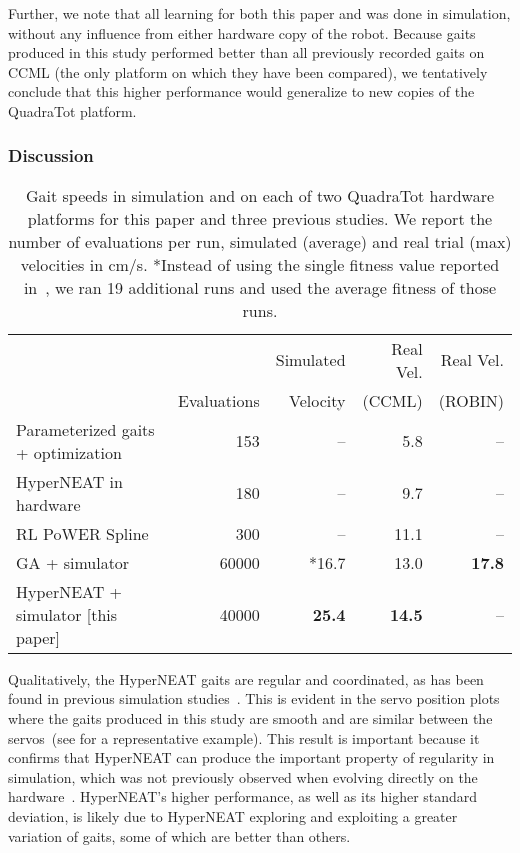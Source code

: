Further, we note that all learning for both this paper
and \cite{glette} was done in simulation, without any influence from
either hardware copy of the robot. Because gaits produced in this
study performed better than all previously recorded gaits on CCML (the only
platform on which they have been compared), we tentatively
conclude that this higher performance would generalize to new copies
of the QuadraTot platform.

\subsubsection{Discussion}

\begin{table}
\begin{center}
\begin{tabular}{|l|r|r|r|r|}
\hline
                                         &              & Simulated  & Real Vel. & Real Vel.  \\
                                         & Evaluations  & Velocity &    (CCML)     & (ROBIN) \\
\hline
Parameterized gaits + optimization \cite{yos:clune}   &153    & --    & 5.8 & --\\
\hline
HyperNEAT in hardware \cite{yos:clune}                 & 180         & --         &   9.7  & --   \\
\hline
RL PoWER Spline \cite{haocheng}                         & 300         & --         &   11.1 & --\\
\hline
GA + simulator \cite{glette}             & 60000       & *16.7       &   13.0   & \textbf{17.8}  \\
\hline
HyperNEAT + simulator [this paper]                     & 40000       & \textbf{25.4}       &   \textbf{14.5} & --\\
\hline
\end{tabular}
\end{center}
\caption{Gait speeds in simulation and on each of two QuadraTot hardware platforms for this paper and three previous studies. We report the number of evaluations per run, simulated (average) and real trial (max) velocities in cm/s. *Instead of using the single fitness value reported in~\cite{glette}, we ran 19 additional runs and used the average fitness of those runs.}  %
\end{table}

Qualitatively, the HyperNEAT gaits are regular and coordinated, as has
been found in previous simulation
studies~\cite{clune2009evolving,clune2011performance}. This is evident
in the servo position plots where the gaits produced in this study are
smooth and are similar between the servos~(see 
for a representative example). This result is important because it
confirms that HyperNEAT can produce the important property of
regularity in simulation, which was not previously observed when
evolving directly on the hardware~\cite{yos:clune}. HyperNEAT's higher
performance, as well as its higher standard deviation, is likely due
to HyperNEAT exploring and exploiting a greater variation of gaits,
some of which are better than others.

